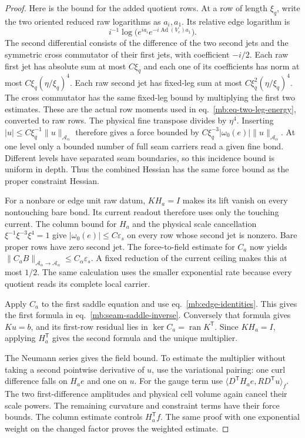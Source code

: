 \documentclass[11pt,letterpaper,reqno]{amsart}
\numberwithin{equation}{section}
\renewcommand{\eqref}[1]{\textup{eq.~\ref{#1}}}
\theoremstyle{definition}
\theoremstyle{remark}
\begin{document}
\begin{proof}
Here is the bound for the added quotient rows. At a row of
length $\xi_q$, write the two oriented reduced raw logarithms
as $a_i,a_1$. Its relative edge logarithm is
\[
 i^{-1}\log\bigl(e^{ia_i}e^{-i\operatorname{Ad}(V_e)a_1}\bigr).
\]
The second differential consists of the difference of the two
second jets and the symmetric cross commutator of their first
jets, with coefficient $-i/2$. Each raw first jet has absolute
sum at most $C\xi_q$ and each one of its coefficients has norm
at most $C\xi_q(\eta/\xi_q)^4$. Each raw second jet has
fixed-leg sum at most $C\xi_q^2(\eta/\xi_q)^4$.
The cross commutator has the same fixed-leg bound by multiplying
the first two estimates. These are the actual row moments used
in \eqref{mb:eq-two-leg-energy}, converted to raw rows.
The physical fine transpose divides by $\eta^4$.
Inserting $|u|\le C\xi_q^{-1}\|u\|_{\mathcal A_\alpha}$
therefore gives a force bounded by
$C\xi_q^{-3}|\omega_0(e)|\|u\|_{\mathcal A_\alpha}$.
At one level only a bounded number of full seam carriers read
a given fine bond. Different levels have separated seam
boundaries, so this incidence bound is uniform in depth.
Thus the combined Hessian has the same force bound as the
proper constraint Hessian.

For a nonbare or edge unit raw datum, $KH_a=I$ makes its lift
vanish on every nontouching bare bond. Its current readout
therefore uses only the touching current. The column bound
for $H_a$ and the physical scale cancellation
$\xi^{-1}\xi^{-3}\xi^4=1$ give
$|\omega_0(e)|\le C\varepsilon_s$ on every row whose second jet
is nonzero. Bare proper rows have zero second jet.
The force-to-field estimate for $C_a$ now yields
$\|C_aB\|_{\mathcal A_\alpha\to\mathcal A_\alpha}
\le C_\alpha\varepsilon_s$.
A fixed reduction of the current ceiling makes this at most
$1/2$. The same calculation uses the smaller exponential rate
because every quotient reads its complete local carrier.

Apply $C_a$ to the first saddle equation and use
\eqref{mb:edge-identities}. This gives the first formula in
\eqref{mb:seam-saddle-inverse}. Conversely that formula gives
$Ku=b$, and its first-row residual lies in
$\ker C_a=\operatorname{ran}K^{\mathsf T}$.
Since $KH_a=I$, applying $H_a^{\mathsf T}$ gives the second
formula and the unique multiplier.

The Neumann series gives the field bound. To estimate the
multiplier without taking a second pointwise derivative of
$u$, use the variational pairing: one curl difference falls
on $H_ae$ and one on $u$. For the gauge term use
$\langle D^{\mathsf T}H_ae,RD^{\mathsf T}u\rangle_f$.
The two first-difference amplitudes and physical cell volume
again cancel their scale powers. The remaining curvature
and constraint terms have their force bounds. The column
estimate controls $H_a^{\mathsf T}f$. The same proof with
one exponential weight on the changed factor proves the
weighted estimate.
\end{proof}
\end{document}
